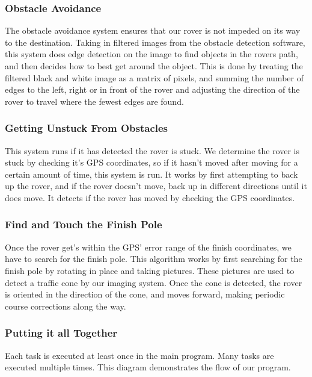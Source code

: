 \documentclass[10pt,letterpaper,onecolumn,draftclsnofoot,journal]{IEEEtran}
\begin{document}
\subsubsection{\textbf{Obstacle Avoidance}}
The obstacle avoidance system ensures that our rover is not impeded on its way to the destination. Taking in filtered images from the obstacle detection software, this system does edge detection on the image to find objects in the rovers path, and then decides how to best get around the object. This is done by treating the filtered black and white image as a matrix of pixels, and summing the number of edges to the left, right or in front of the rover and adjusting the direction of the rover to travel where the fewest edges are found.\vspace{.3cm}

\subsubsection{\textbf{Getting Unstuck From Obstacles}}
This system runs if it has detected the rover is stuck. We determine the rover is stuck by checking it's GPS coordinates, so if it hasn't moved after moving for a certain amount of time, this system is run. It works by first attempting to back up the rover, and if the rover doesn’t move, back up in different directions until it does move. It detects if the rover has moved by checking the GPS coordinates.\vspace{.3cm}

\subsubsection{\textbf{Find and Touch the Finish Pole}}
Once the rover get’s within the GPS’ error range of the finish coordinates, we have to search for the finish pole. This algorithm works by first searching for the finish pole by rotating in place and taking pictures. These pictures are used to detect a traffic cone by our imaging system. Once the cone is detected, the rover is oriented in the direction of the cone, and moves forward, making periodic course corrections along the way.\vspace{.3cm}

\subsubsection{\textbf{Putting it all Together}}
Each task is executed at least once in the main program. Many tasks are executed multiple times. This diagram demonstrates the flow of our program.\vspace{.3cm}
\end{document}
